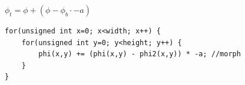 
$\phi_t = \phi + (\phi - \phi_b \cdot -a)$

\begin{lstlisting}
for(unsigned int x=0; x<width; x++) {
    for(unsigned int y=0; y<height; y++) {
        phi(x,y) += (phi(x,y) - phi2(x,y)) * -a; //morph
    }
}
\end{lstlisting}



